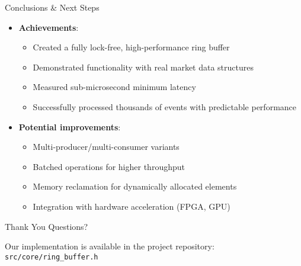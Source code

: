 \documentclass{beamer}
\begin{document}
\begin{frame}{Conclusions \& Next Steps}
\begin{itemize}
    \item \textbf{Achievements}:
    \begin{itemize}
        \item Created a fully lock-free, high-performance ring buffer
        \item Demonstrated functionality with real market data structures
        \item Measured sub-microsecond minimum latency
        \item Successfully processed thousands of events with predictable performance
    \end{itemize}
    \item \textbf{Potential improvements}:
    \begin{itemize}
        \item Multi-producer/multi-consumer variants
        \item Batched operations for higher throughput
        \item Memory reclamation for dynamically allocated elements
        \item Integration with hardware acceleration (FPGA, GPU)
    \end{itemize}
\end{itemize}
\end{frame}

\begin{frame}{Thank You}
\centering
\Huge{Questions?}

\vspace{1cm}
\normalsize
Our implementation is available in the project repository:\\
\texttt{src/core/ring\_buffer.h}
\end{frame}
\end{document}
